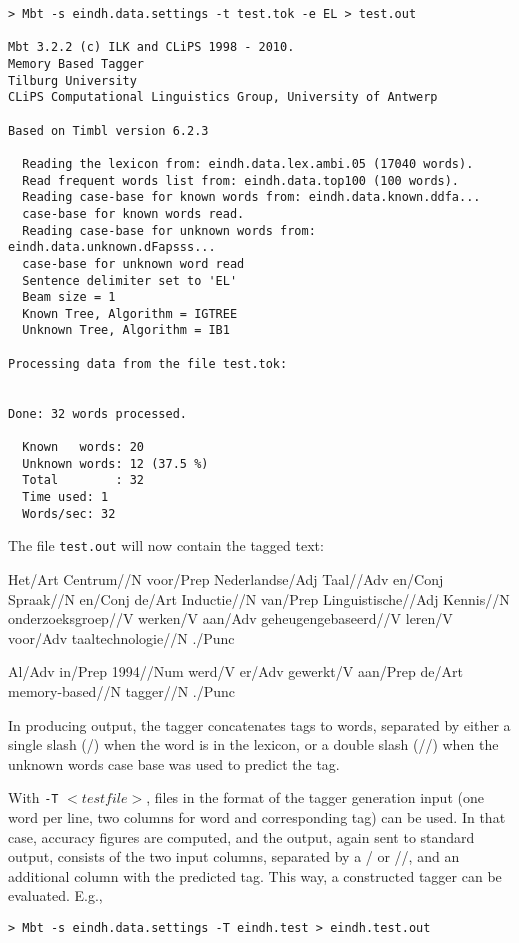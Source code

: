 \documentclass{report}
\begin{document}
{\small
\begin{verbatim}
> Mbt -s eindh.data.settings -t test.tok -e EL > test.out

Mbt 3.2.2 (c) ILK and CLiPS 1998 - 2010.
Memory Based Tagger 
Tilburg University
CLiPS Computational Linguistics Group, University of Antwerp

Based on Timbl version 6.2.3

  Reading the lexicon from: eindh.data.lex.ambi.05 (17040 words).
  Read frequent words list from: eindh.data.top100 (100 words).
  Reading case-base for known words from: eindh.data.known.ddfa... 
  case-base for known words read.
  Reading case-base for unknown words from: eindh.data.unknown.dFapsss... 
  case-base for unknown word read
  Sentence delimiter set to 'EL'
  Beam size = 1
  Known Tree, Algorithm = IGTREE
  Unknown Tree, Algorithm = IB1

Processing data from the file test.tok:


Done: 32 words processed.

  Known   words: 20
  Unknown words: 12 (37.5 %)
  Total        : 32
  Time used: 1
  Words/sec: 32
\end{verbatim}
}

The file {\tt test.out} will now contain the tagged text:

{\small 

Het/Art Centrum//N voor/Prep Nederlandse/Adj Taal//Adv en/Conj
Spraak//N en/Conj de/Art Inductie//N van/Prep Linguistische//Adj
Kennis//N onderzoeksgroep//V werken/V aan/Adv geheugengebaseerd//V
leren/V voor/Adv taaltechnologie//N ./Punc

Al/Adv in/Prep 1994//Num werd/V er/Adv gewerkt/V aan/Prep de/Art memory-based//N tagger//N ./Punc  
}

In producing output, the tagger concatenates tags to words,
separated by either a single slash (/) when the word is in the
lexicon, or a double slash (//) when the unknown words case base was
used to predict the tag.

With {\tt -T} $<testfile>$, files in the format of the tagger generation
input (one word per line, two columns for word and corresponding tag)
can be used. In that case, accuracy figures are computed, and the
output, again sent to standard output, consists of the two input
columns, separated by a / or //, and an additional column with the
predicted tag. This way, a constructed tagger can be evaluated. E.g., 

{\small
\begin{verbatim}
> Mbt -s eindh.data.settings -T eindh.test > eindh.test.out
\end{verbatim}
}
\end{document}
